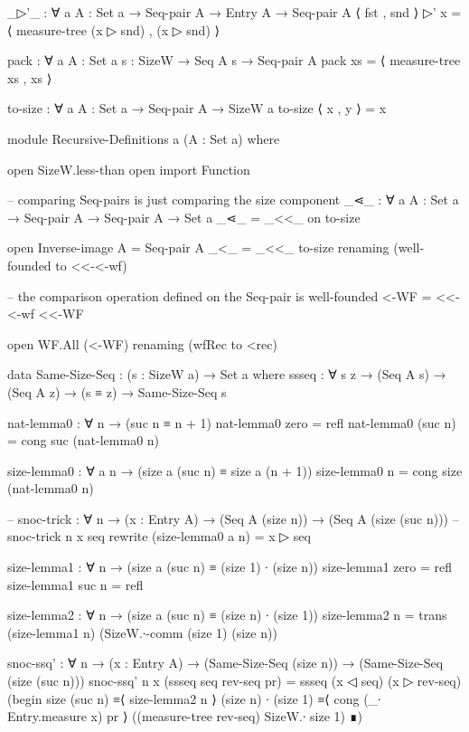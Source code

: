     _▷'_ : ∀ {a} {A : Set a}
           → Seq-pair A → Entry A → Seq-pair A
    ⟨ fst , snd ⟩ ▷' x = ⟨ measure-tree (x ▷ snd) , (x ▷ snd) ⟩

    pack : ∀ {a} {A : Set a} {s : SizeW} → Seq A s → Seq-pair A
    pack xs = ⟨ measure-tree xs , xs ⟩

    to-size : ∀ {a} {A : Set a} → Seq-pair A → SizeW {a}
    to-size ⟨ x , y ⟩ = x

    module Recursive-Definitions {a} (A : Set a) where

      open SizeW.less-than
      open import Function

      -- comparing Seq-pairs is just comparing the size component
      _⋖_ : ∀ {a} {A : Set a} → Seq-pair A → Seq-pair A → Set a
      _⋖_ = _<<_ on to-size

      open Inverse-image
        {A = Seq-pair A}
        {_<_ = _<<_}
        to-size
        renaming (well-founded to <<-<-wf)

    -- the comparison operation defined on the Seq-pair is well-founded
      <-WF = <<-<-wf <<-WF

      open WF.All (<-WF) renaming (wfRec to <rec)

      data Same-Size-Seq : (s : SizeW {a}) → Set a where
        ssseq : ∀ {s} {z} → (Seq A s) → (Seq A z) → (s ≡ z) → Same-Size-Seq s

      nat-lemma0 : ∀ n → (suc n ≡ n + 1)
      nat-lemma0 zero = refl
      nat-lemma0 (suc n) = cong suc (nat-lemma0 n)

      size-lemma0 : ∀ {a} n → (size {a} (suc n) ≡ size {a} (n + 1))
      size-lemma0 n = cong size (nat-lemma0 n)

      -- snoc-trick : ∀ {n} → (x : Entry A) → (Seq A (size n)) → (Seq A (size (suc n)))
      -- snoc-trick {n} x seq rewrite (size-lemma0 {a} n) = x ▷ seq

      size-lemma1 : ∀ {n} → (size {a} (suc n) ≡ (size 1) ∙ (size n))
      size-lemma1 {zero} = refl
      size-lemma1 {suc n} = refl

      size-lemma2 : ∀ {n} → (size {a} (suc n) ≡ (size n) ∙ (size 1))
      size-lemma2 {n} = trans (size-lemma1 {n}) (SizeW.∙-comm (size 1) (size n))

      snoc-ssq' : ∀ {n}
              → (x : Entry A)
              → (Same-Size-Seq (size n))
              → (Same-Size-Seq (size (suc n)))
      snoc-ssq' {n} x (ssseq seq rev-seq pr) = ssseq (x ◁ seq) (x ▷ rev-seq)
        (begin
          size (suc n)
        ≡⟨ size-lemma2 {n} ⟩
          (size n) ∙ (size 1)
        ≡⟨ cong (_∙ Entry.measure x) pr ⟩
          ((measure-tree rev-seq) SizeW.∙ size 1)
        ∎)

